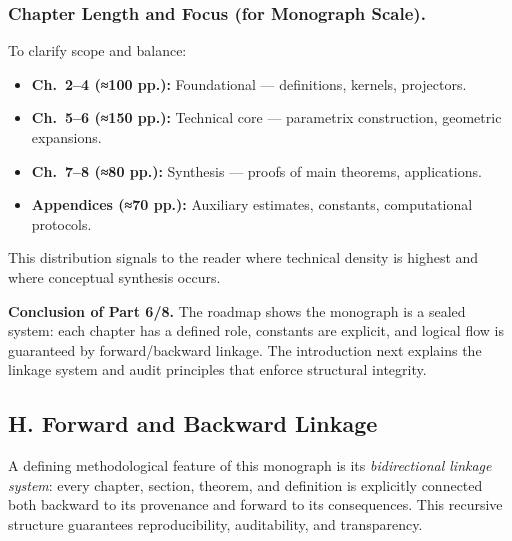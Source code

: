 \subsubsection*{Chapter Length and Focus (for Monograph Scale).}
To clarify scope and balance:
\begin{itemize}
  \item \textbf{Ch.~2–4 (≈100 pp.):} Foundational — definitions, kernels, projectors.
  \item \textbf{Ch.~5–6 (≈150 pp.):} Technical core — parametrix construction, geometric expansions.
  \item \textbf{Ch.~7–8 (≈80 pp.):} Synthesis — proofs of main theorems, applications.
  \item \textbf{Appendices (≈70 pp.):} Auxiliary estimates, constants, computational protocols.
\end{itemize}
This distribution signals to the reader where technical density is highest
and where conceptual synthesis occurs.

\medskip

\noindent\textbf{Conclusion of Part 6/8.}
The roadmap shows the monograph is a sealed system:
each chapter has a defined role, constants are explicit,
and logical flow is guaranteed by forward/backward linkage.
The introduction next explains the linkage system and audit principles
that enforce structural integrity.


\subsection*{H. Forward and Backward Linkage}

A defining methodological feature of this monograph is its
\emph{bidirectional linkage system}:
every chapter, section, theorem, and definition
is explicitly connected both backward to its provenance
and forward to its consequences.
This recursive structure guarantees reproducibility,
auditability, and transparency.


